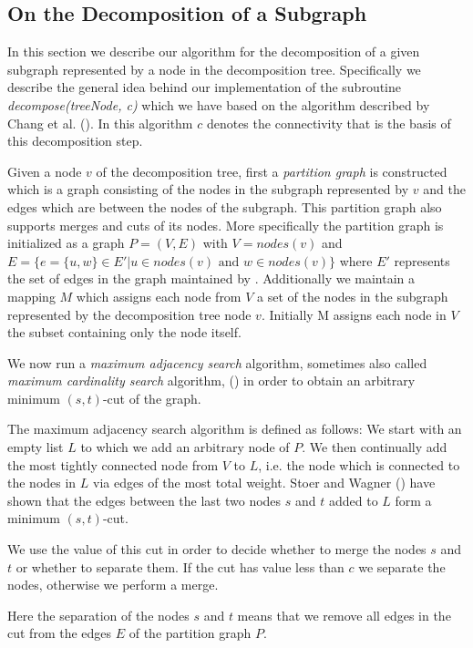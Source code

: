 \documentclass[a4paper, 10pt]{article}
\newcommand{\crep}{\text{C{\scriptsize REP}}}
\theoremstyle{definition}
\begin{document}
\subsection{On the Decomposition of a Subgraph}
\label{decomp_desc}
In this section we describe our algorithm for the decomposition of a given subgraph represented by a node in the decomposition tree. Specifically we describe the general idea behind our implementation of the subroutine \textit{decompose(treeNode, c)} which we have based on the algorithm described by Chang et al. (\cite{Chang2013}). In this algorithm $c$ denotes the connectivity that is the basis of this decomposition step.

Given a node $v$ of the decomposition tree, first a \textit{partition graph} is constructed which is a graph consisting of the nodes in the subgraph represented by $v$ and the edges which are between the nodes of the subgraph. This partition graph also supports merges and cuts of its nodes. More specifically the partition graph is initialized as a graph $P=(V,E)$ with $V=nodes(v)$ and $E=\{e=\{u,w\}\in E'|u\in nodes(v)\text{ and }w\in nodes(v)\}$ where $E'$ represents the set of edges in the graph maintained by \crep{}. Additionally we maintain a mapping $M$ which assigns each node from $V$ a set of the nodes in the subgraph represented by the decomposition tree node $v$. Initially M assigns each node in $V$ the subset containing only the node itself.

We now run a \textit{maximum adjacency search} algorithm, sometimes also called \textit{maximum cardinality search} algorithm, (\cite{Stoer1997}) in order to obtain an arbitrary minimum $(s,t)$-cut of the graph.

The maximum adjacency search algorithm is defined as follows: We start with an empty list $L$ to which we add an arbitrary node of $P$. We then continually add the most tightly connected node from $V$ to $L$, i.e. the node which is connected to the nodes in $L$ via edges of the most total weight. Stoer and Wagner (\cite{Stoer1997}) have shown that the edges between the last two nodes $s$ and $t$ added to $L$ form a minimum $(s,t)$-cut.

We use the value of this cut in order to decide whether to merge the nodes $s$ and $t$ or whether to separate them. If the cut has value less than $c$ we separate the nodes, otherwise we perform a merge.

Here the separation of the nodes $s$ and $t$ means that we remove all edges in the cut from the edges $E$ of the partition graph $P$.
\end{document}
